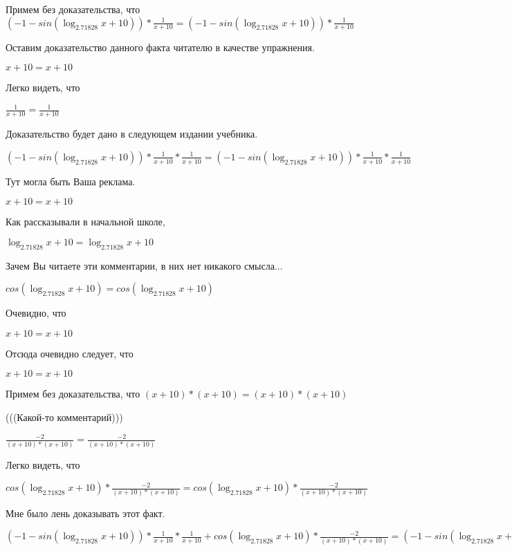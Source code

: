 \documentclass[12pt,a4paper,fleqn]{article}
\theoremstyle{definition}
\begin{document}
Примем без доказательства, что
$( -1  - sin(\log_{ 2.71828 }{ x  +  10 })) * \frac{ 1 }{ x  +  10 }
 = ( -1  - sin(\log_{ 2.71828 }{ x  +  10 })) * \frac{ 1 }{ x  +  10 }
$

Оставим доказательство данного факта читателю в качестве упражнения.

$ x  +  10  =  x  +  10 $

Легко видеть, что

$\frac{ 1 }{ x  +  10 }
 = \frac{ 1 }{ x  +  10 }
$

Доказательство будет дано в следующем издании учебника.

$( -1  - sin(\log_{ 2.71828 }{ x  +  10 })) * \frac{ 1 }{ x  +  10 }
 * \frac{ 1 }{ x  +  10 }
 = ( -1  - sin(\log_{ 2.71828 }{ x  +  10 })) * \frac{ 1 }{ x  +  10 }
 * \frac{ 1 }{ x  +  10 }
$

Тут могла быть Ваша реклама.

$ x  +  10  =  x  +  10 $

Как рассказывали в начальной школе,

$\log_{ 2.71828 }{ x  +  10 } = \log_{ 2.71828 }{ x  +  10 }$

Зачем Вы читаете эти комментарии, в них нет никакого смысла...

$cos(\log_{ 2.71828 }{ x  +  10 }) = cos(\log_{ 2.71828 }{ x  +  10 })$

Очевидно, что

$ x  +  10  =  x  +  10 $

Отсюда очевидно следует, что

$ x  +  10  =  x  +  10 $

Примем без доказательства, что
$( x  +  10 ) * ( x  +  10 ) = ( x  +  10 ) * ( x  +  10 )$

(((Какой-то комментарий)))

$\frac{ -2 }{( x  +  10 ) * ( x  +  10 )}
 = \frac{ -2 }{( x  +  10 ) * ( x  +  10 )}
$

Легко видеть, что

$cos(\log_{ 2.71828 }{ x  +  10 }) * \frac{ -2 }{( x  +  10 ) * ( x  +  10 )}
 = cos(\log_{ 2.71828 }{ x  +  10 }) * \frac{ -2 }{( x  +  10 ) * ( x  +  10 )}
$

Мне было лень доказывать этот факт.

$( -1  - sin(\log_{ 2.71828 }{ x  +  10 })) * \frac{ 1 }{ x  +  10 }
 * \frac{ 1 }{ x  +  10 }
 + cos(\log_{ 2.71828 }{ x  +  10 }) * \frac{ -2 }{( x  +  10 ) * ( x  +  10 )}
 = ( -1  - sin(\log_{ 2.71828 }{ x  +  10 })) * \frac{ 1 }{ x  +  10 }
 * \frac{ 1 }{ x  +  10 }
 + cos(\log_{ 2.71828 }{ x  +  10 }) * \frac{ -2 }{( x  +  10 ) * ( x  +  10 )}
$
\end{document}
